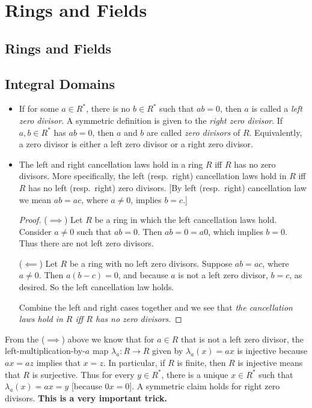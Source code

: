 \documentclass[11pt]{article}
\newcommand{\df}[1]{\textit{\textsf{#1}}}
\begin{document}
\section{Rings and Fields}
\setcounter{subsection}{17}
\subsection{Rings and Fields}
\subsection{Integral Domains}
\begin{itemize}
    \item If for some $a \in R^*$, there is no $b \in R^*$ such that $ab = 0$, then $a$ is called a \df{left zero divisor}. A symmetric definition is given to the \df{right zero divisor}. If $a,b \in R^*$ has $ab=0$, then $a$ and $b$ are called \df{zero divisors} of $R$. Equivalently, a zero divisor is either a left zero divisor or a right zero divisor.
    \item The left and right cancellation laws hold in a ring $R$ iff $R$ has no zero divisors. More specifically, the left (resp.\ right) cancellation laws hold in $R$ iff $R$ has no left (resp.\ right) zero divisors. [By left (resp.\ right) cancellation law we mean $ab = ac$, where $a \neq 0$, implies $b=c$.]
    \begin{proof}
        ($\implies$) Let $R$ be a ring in which the left cancellation laws hold. Consider $a \neq 0$ such that $ab=0$. Then $ab = 0 = a0$, which implies $b=0$. Thus there are not left zero divisors.

        ($\impliedby$) Let $R$ be a ring with no left zero divisors. Suppose $ab=ac$, where $a \neq 0$. Then $a(b-c)=0$, and because $a$ is not a left zero divisor, $b=c$, as desired. So the left cancellation law holds.

        Combine the left and right cases together and we see that \emph{the cancellation laws hold in $R$ iff $R$ has no zero divisors}.
    \end{proof}
\end{itemize}
\begin{framed}
From the ($\implies$) above we know that for $a \in R$ that is not a left zero divisor, the left-multiplication-by-$a$ map $\lambda_a: R \to R$ given by $\lambda_a(x) = ax$ is injective because $ax = az$ implies that $x = z$. In particular, if $R$ is finite, then $R$ is injective means that $R$ is surjective. Thus for every $y \in R^*$, there is a unique $x \in R^*$ such that $\lambda_a(x)=ax=y$ [because $0x=0$]. A symmetric claim holds for right zero divisors. \textbf{This is a very important trick.}
\end{framed}
\end{document}
